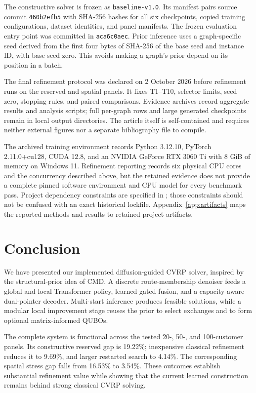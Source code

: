 \documentclass[11pt,a4paper]{article}
\newcommand{\artifact}[1]{\path{#1}}
\begin{document}
The constructive solver is frozen as \texttt{baseline-v1.0}. Its manifest
pairs source commit \texttt{460b2efb5} with SHA-256 hashes for all six
checkpoints, copied training configurations, dataset identities, and
panel manifests. The frozen evaluation entry point was committed in
\texttt{aca6c0aec}. Prior inference uses a graph-specific seed derived
from the first four bytes of SHA-256 of the base seed and instance ID,
with base seed zero. This avoids making a graph's prior depend on its
position in a batch.

The final refinement protocol was declared on 2 October 2026 before
refinement runs on the reserved and spatial panels. It fixes T1--T10,
selector limits, seed zero, stopping rules, and paired comparisons.
Evidence archives record aggregate results and analysis scripts; full
per-graph rows and large generated checkpoints remain in local output
directories. The article itself is self-contained and requires neither
external figures nor a separate bibliography file to compile.

The archived training environment records Python 3.12.10, PyTorch
2.11.0+cu128, CUDA 12.8, and an NVIDIA GeForce RTX 3060 Ti with 8 GiB of
memory on Windows 11. Refinement reporting records six physical CPU cores
and the concurrency described above, but the retained evidence does not
provide a complete pinned software environment and CPU model for every
benchmark pass. Project dependency constraints are specified in
\artifact{pyproject.toml}; those constraints should not be confused with
an exact historical lockfile. Appendix~\ref{app:artifacts} maps the
reported methods and results to retained project artifacts.

\section{Conclusion}

We have presented our implemented diffusion-guided CVRP solver, inspired
by the structural-prior idea of CMD. A discrete route-membership denoiser
feeds a global and local Transformer policy, learned gated fusion, and
a capacity-aware dual-pointer decoder. Multi-start inference produces
feasible solutions, while a modular local improvement stage reuses the
prior to select exchanges and to form optional matrix-informed QUBOs.

The complete system is functional across the tested 20-, 50-, and
100-customer panels. Its constructive reserved gap is 19.22\%; inexpensive
classical refinement reduces it to 9.69\%, and larger restarted search
to 4.14\%. The corresponding spatial stress gap falls from 16.53\% to
3.54\%. These outcomes establish substantial refinement value while
showing that the current learned construction remains behind strong
classical CVRP solving.
\end{document}
